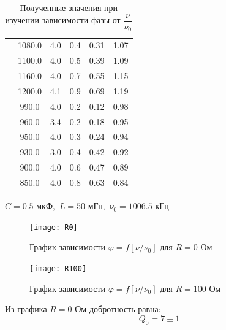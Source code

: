 \documentclass[a4paper, 12pt]{article}
\begin{document}
\begin{table}[H]
\begin{tabular}{|c|c|c|c|c|c|}
                                         & 1080.0            & 4.0   & 0.4 & 0.31   & 1.07      \\ \cline{2-6} 
                                         & 1100.0            & 4.0   & 0.5 & 0.39   & 1.09      \\ \cline{2-6} 
                                         & 1160.0            & 4.0   & 0.7 & 0.55   & 1.15      \\ \cline{2-6} 
                                         & 1200.0            & 4.1   & 0.9 & 0.69   & 1.19      \\ \cline{2-6} 
                                         & 990.0             & 4.0   & 0.2 & 0.12   & 0.98      \\ \cline{2-6} 
                                         & 960.0             & 3.4   & 0.2 & 0.18   & 0.95      \\ \cline{2-6} 
                                         & 950.0             & 4.0   & 0.3 & 0.24   & 0.94      \\ \cline{2-6} 
                                         & 930.0             & 3.0   & 0.4 & 0.42   & 0.92      \\ \cline{2-6} 
                                         & 900.0             & 4.0   & 0.6 & 0.47   & 0.89      \\ \cline{2-6} 
                                         & 850.0             & 4.0   & 0.8 & 0.63   & 0.84      \\ \hline
\end{tabular}
\caption{Полученные значения при изучении зависимости фазы от $\dfrac{\nu}{\nu_0}$}
\end{table}

$C = 0.5 \text{ мкФ},$
$L =50 \text{ мГн},$
$\nu_0 = 1006.5 \text{ кГц}$

\begin {figure}[H]
	\begin{center}
		\texttt{[image: R0]}
		\caption{График зависимости $\varphi = f[\nu/\nu_0] \text{ для $R = 0$ Ом}$}
	\end{center}
\end {figure}

\begin {figure}[H]
	\begin{center}
		\texttt{[image: R100]}
		\caption{График зависимости $\varphi = f[\nu/\nu_0] \text{ для $R = 100$ Ом}$}
	\end{center}
\end {figure}

Из графика $R = 0$ Ом добротность равна:
$$Q_{0}=7 \pm1$$
\end{document}
